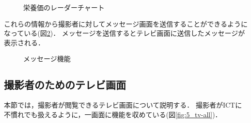 \documentclass[../report]{subfiles}
\begin{document}
\begin{figure}[htbp]
    \begin{center}
        \caption{栄養価のレーダーチャート}
        \label{fig:5_radar}
    \end{center}
\end{figure}

これらの情報から撮影者に対してメッセージ画面を送信することができるようになっている(図\ref{fig:5_message})．
メッセージを送信するとテレビ画面に送信したメッセージが表示される．

\begin{figure}[htbp]
    \begin{center}
        \caption{メッセージ機能}
        \label{fig:5_message}
    \end{center}
\end{figure}

\subsection{撮影者のためのテレビ画面}
本節では，撮影者が閲覧できるテレビ画面について説明する．
撮影者がICTに不慣れでも扱えるように，一画面に機能を収めている(図\ref{fig:5_tv-all})．
\end{document}
